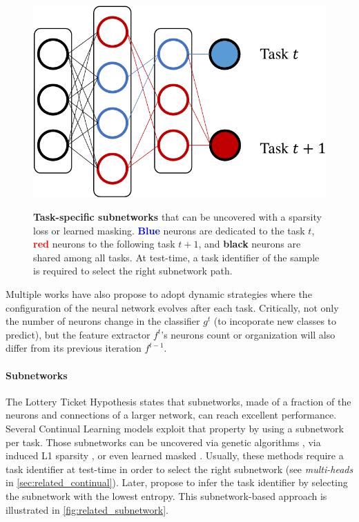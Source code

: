 \begin{figure}[tb]
      \begin{center}
            {\includegraphics[width=0.5\linewidth]{images/related/subnetworks.pdf}}
      \end{center}
      \caption{\textbf{Task-specific subnetworks} that can be uncovered with a sparsity loss or
            learned masking. \textcolor{blue}{\textbf{Blue}} neurons are dedicated to
            the task $t$, \textcolor{red}{\textbf{red}} neurons to the following task
            $t+1$, and \textbf{black} neurons are shared among all tasks. At
            test-time, a task identifier of the sample is required to select the
            right subnetwork path.}
      \label{fig:related_subnetwork}
\end{figure}

Multiple works have also propose to adopt dynamic strategies where the configuration of the neural
network evolves after each task. Critically, not only the number of neurons change in the classifier $g^t$
(to incoporate new classes to predict), but the feature extractor $f^t$'s neurons count or organization
will also differ from its previous iteration $f^{t-1}$.


\paragraph{Subnetworks} The Lottery Ticket Hypothesis \citep{frankle2019lottery_ticket} states that
subnetworks, made of a fraction of the neurons and connections of a larger network, can reach
excellent performance. Several Continual Learning models exploit that property by using a
subnetwork per task. Those subnetworks can be uncovered via genetic algorithms
\citep{fernando2017path_net}, via induced L1 sparsity \citep{golkar2019neural_pruning}, or even
learned masked \cite{serra2018hat,hung2019cpg}. Usually, these methods require a task identifier at
test-time in order to select the right subnetwork (see \textit{multi-heads} in
\autoref{sec:related_continual}). Later, \cite{wortsman2020supermasks} propose to infer the task
identifier by selecting the subnetwork with the lowest entropy. This subnetwork-based approach is
illustrated in \autoref{fig:related_subnetwork}.


